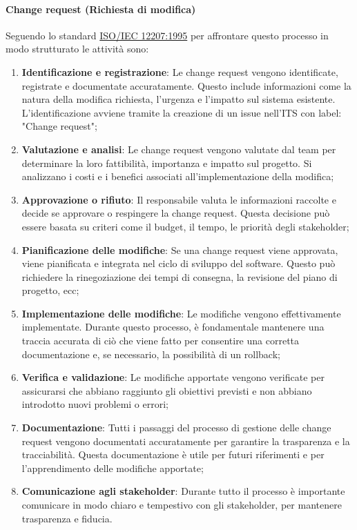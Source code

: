 \paragraph{Change request (Richiesta di modifica)}
Seguendo lo standard \href{https://www.math.unipd.it/~tullio/IS-1/2009/Approfondimenti/ISO_12207-1995.pdf}{ISO/IEC 12207:1995} per affrontare questo processo in modo strutturato le attività sono:
\begin{enumerate}
    \item \textbf{Identificazione e registrazione}: Le change request vengono identificate, registrate e documentate accuratamente. Questo include informazioni come la natura della modifica richiesta, l'urgenza e l'impatto sul sistema esistente. \\
    L'identificazione avviene tramite la creazione di un issue nell'ITS con label: "Change request";
    \item \textbf{Valutazione e analisi}: Le change request vengono valutate dal team per determinare la loro fattibilità, importanza e impatto sul progetto. Si analizzano i costi e i benefici associati all'implementazione della modifica;
    \item \textbf{Approvazione o rifiuto}: Il responsabile valuta le informazioni raccolte e decide se approvare o respingere la change request. Questa decisione può essere basata su criteri come il budget, il tempo, le priorità degli stakeholder;
    \item \textbf{Pianificazione delle modifiche}: Se una change request viene approvata, viene pianificata e integrata nel ciclo di sviluppo del software. Questo può richiedere la rinegoziazione dei tempi di consegna, la revisione del piano di progetto, ecc; 
    \item \textbf{Implementazione delle modifiche}: Le modifiche vengono effettivamente implementate. Durante questo processo, è fondamentale mantenere una traccia accurata di ciò che viene fatto per consentire una corretta documentazione e, se necessario, la possibilità di un rollback;
    \item \textbf{Verifica e validazione}: Le modifiche apportate vengono verificate per assicurarsi che abbiano raggiunto gli obiettivi previsti e non abbiano introdotto nuovi problemi o errori;
    \item \textbf{Documentazione}: Tutti i passaggi del processo di gestione delle change request vengono documentati accuratamente per garantire la trasparenza e la tracciabilità. Questa documentazione è utile per futuri riferimenti e per l'apprendimento delle modifiche apportate;
    \item \textbf{Comunicazione agli stakeholder}: Durante tutto il processo è importante comunicare in modo chiaro e tempestivo con gli stakeholder, per mantenere trasparenza e fiducia.
\end{enumerate}

